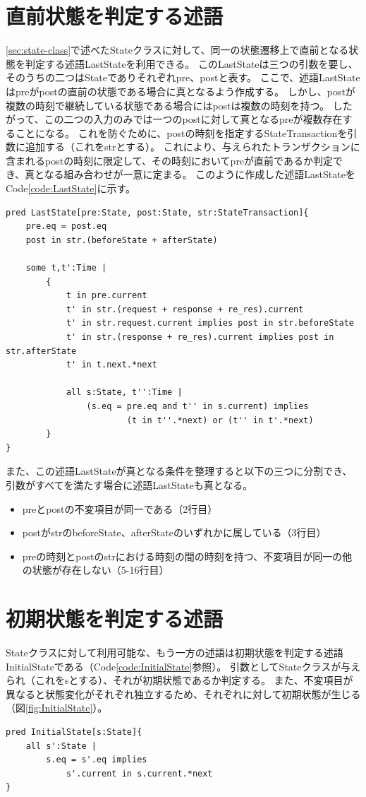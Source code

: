 \documentclass[12pt,a4paper]{jbook}
\begin{document}
\section{直前状態を判定する述語}
\ref{sec:state-class}で述べたStateクラスに対して、同一の状態遷移上で直前となる状態を判定する述語LastStateを利用できる。
このLastStateは三つの引数を要し、そのうちの二つはStateでありそれぞれpre、postと表す。
\color{red}
ここで、述語LastStateはpreがpostの直前の状態である場合に真となるよう作成する。
しかし、postが複数の時刻で継続している状態である場合にはpostは複数の時刻を持つ。
したがって、この二つの入力のみでは一つのpostに対して真となるpreが複数存在することになる。
これを防ぐために、postの時刻を指定するStateTransactionを引数に追加する（これをstrとする）。
これにより、与えられたトランザクションに含まれるpostの時刻に限定して、その時刻においてpreが直前であるか判定でき、真となる組み合わせが一意に定まる。
このように作成した述語LastStateをCode\ref{code:LastState}に示す。
\color{black}

\begin{lstlisting}[caption=状態遷移において直前の状態を判定する述語, label=code:LastState]
pred LastState[pre:State, post:State, str:StateTransaction]{
	pre.eq = post.eq
	post in str.(beforeState + afterState)

	some t,t':Time |
		{
			t in pre.current
			t' in str.(request + response + re_res).current
			t' in str.request.current implies post in str.beforeState
			t' in str.(response + re_res).current implies post in str.afterState
			t' in t.next.*next

			all s:State, t'':Time |
				(s.eq = pre.eq and t'' in s.current) implies
						(t in t''.*next) or (t'' in t'.*next)
		}
}
\end{lstlisting}

また、この述語LastStateが真となる条件を整理すると以下の三つに分割でき、引数がすべてを満たす場合に述語LastStateも真となる。
\begin{itemize}
\item preとpostの不変項目が同一である（2行目）
\item postがstrのbeforeState、afterStateのいずれかに属している（3行目）
\item preの時刻とpostのstrにおける時刻の間の時刻を持つ、不変項目が同一の他の状態が存在しない（5-16行目）
\end{itemize}

\section{初期状態を判定する述語}
Stateクラスに対して利用可能な、もう一方の述語は初期状態を判定する述語InitialStateである（Code\ref{code:InitialState}参照）。
引数としてStateクラスが与えられ（これをsとする）、それが初期状態であるか判定する。
また、不変項目が異なると状態変化がそれぞれ独立するため、それぞれに対して初期状態が生じる（図\ref{fig:InitialState}）。
\begin{lstlisting}[caption=状態遷移において初期状態を判定する述語, label=code:InitialState]
pred InitialState[s:State]{
	all s':State |
		s.eq = s'.eq implies
			s'.current in s.current.*next
}
\end{lstlisting}
\end{document}
